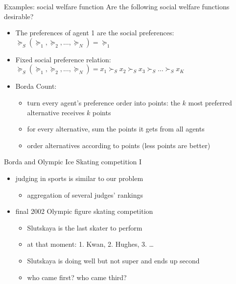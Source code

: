 \documentclass[bigger]{beamer}
\begin{document}
\begin{frame}[label={sec:org65547e7}]{Examples: social welfare function}
Are the following social welfare functions desirable?
\begin{itemize}
\item The preferences of agent 1 are the social preferences: \(\succeq_S (\succeq_1,\succeq_2,\dots,\succeq_N)=\succeq_1\)
\item Fixed social preference relation: \(\succeq_S (\succeq_1,\succeq_2,\dots,\succeq_N)=x_1\succ_S x_2\succ_S x_3\succ_S\dots\succ_S x_K\)
\item Borda Count:
\begin{itemize}
\item turn every agent's preference order into points: the \(k\) most preferred alternative receives \(k\) points
\item for every alternative, sum the points it gets from all agents
\item order alternatives according to points (less points are better)
\end{itemize}
\end{itemize}
\end{frame}
\begin{frame}[label={sec:orgaa13bde}]{Borda and Olympic Ice Skating  competition I}
\begin{itemize}
\item judging in sports is similar to our problem
\begin{itemize}
\item aggregation of several judges' rankings
\end{itemize}
\item final 2002 Olympic figure skating competition
\begin{itemize}
\item Slutskaya is the last skater to perform
\item at that moment: 1. Kwan, 2. Hughes, 3. \ldots{}
\item Slutskaya is doing well but not super and ends up second
\item who came first? who came third?
\end{itemize}
\end{itemize}
\end{frame}
\end{document}

